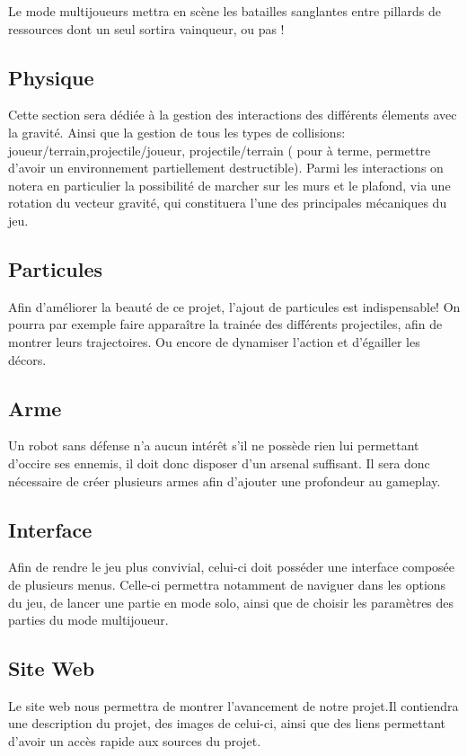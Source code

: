 ﻿\documentclass{article}
\begin{document}
Le mode multijoueurs mettra en scène les batailles sanglantes entre pillards de ressources dont un seul 
sortira vainqueur, ou pas !


\subsection{Physique}
Cette section sera dédiée à la gestion des interactions des différents élements avec la gravité.
Ainsi que la gestion de tous les types de collisions: joueur/terrain,projectile/joueur, projectile/terrain ( pour à terme, permettre d'avoir un
environnement partiellement destructible). Parmi les interactions on notera en particulier la possibilité de marcher sur 
les murs et le plafond, via une rotation du vecteur gravité, qui constituera l'une des principales mécaniques du jeu.


\subsection{Particules}
Afin d'améliorer la beauté de ce projet, l'ajout de particules est indispensable!
On pourra par exemple faire apparaître la trainée des différents projectiles, afin de montrer leurs
trajectoires. Ou encore de dynamiser l'action et d'égailler les décors.

\subsection{Arme}
Un robot sans défense n'a aucun intérêt s'il ne possède rien lui permettant d'occire ses ennemis, 
il doit donc disposer d'un arsenal suffisant. Il sera donc nécessaire de créer plusieurs armes
afin d'ajouter une profondeur au gameplay.


\subsection{Interface}
Afin de rendre le jeu plus convivial, celui-ci doit posséder 
une interface composée de plusieurs menus. Celle-ci 
permettra notamment de naviguer dans les options du jeu, de
 lancer une partie en mode solo, ainsi que de choisir les
 paramètres des parties du mode multijoueur.

\newpage\subsection{Site Web}
Le site web nous permettra de montrer l'avancement de notre projet.Il contiendra une description du projet, des images de celui-ci, ainsi
que des liens permettant d'avoir un accès rapide aux sources du projet.
\end{document}
